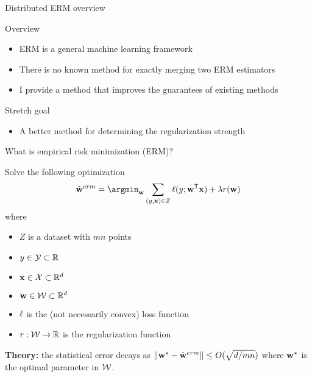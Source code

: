 \begin{frame}{Distributed ERM overview}

Overview
\begin{itemize}
\item
ERM is a general machine learning framework

\item
There is no known method for exactly merging two ERM estimators

\item
I provide a method that improves the guarantees of existing methods

\end{itemize}

\vspace{0.15in}
Stretch goal
\begin{itemize}
\item A better method for determining the regularization strength
\end{itemize}

\end{frame}


\begin{frame}{What is empirical risk minimization (ERM)?}

Solve the following optimization
\begin{equation}
\wmle = \argmin_{\w} \sum_{(y,\x)\in Z} \loss(y;\trans\w\x) + \lambda\reg(\w)
\end{equation}
where
\begin{itemize}
\item $Z$ is a dataset with $mn$ points
\item $y\in\mathcal{Y}\subset\mathbb R$
\item $\mathbf{x}\in\mathcal{X}\subset\mathbb R^d$
\item $\mathbf w\in{\mathcal W}\subset\mathbb R^d$
\item $\ell$ is the (not necessarily convex) loss function
\item $r : {\mathcal W}\to\mathbb R$ is the regularization function
\end{itemize}

\vspace{0.15in}
\textbf{Theory:} the statistical error decays as ${\lVert {{\mathbf w^{*}}-\hat{\mathbf w}^{erm}} \rVert} \le O(\sqrt{d/mn})$ where ${\mathbf w^{*}}$ is the optimal parameter in ${\mathcal W}$.
\end{frame}


